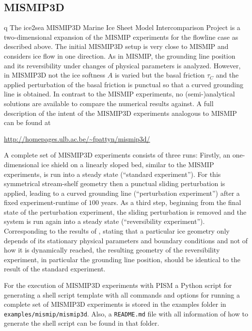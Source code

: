 \subsection{MISMIP3D}\label{subsect:MISMIP3D}
q
 The ice2sea MISMIP3D Marine Ice Sheet Model Intercomparison Project is a two-dimensional expansion of the MISMIP experiments for the flowline case as described above. The initial MISMIP3D setup is very close to MISMIP and considers ice flow in one direction. As in MISMIP, the grounding line position and its reversibility under changes of physical parameters is analyzed. However, in MISMIP3D not the ice softness $A$ is varied but the basal friction $\tau_C$ and the applied perturbation of the basal friction is punctual so that a curved grounding line is obtained. In contrast to the MISMIP experiments, no (semi-)analytical solutions are available to compare the numerical results against. A full description of the intent of the MISMIP3D experiments analogous to MISMIP can be found at

\centerline{\url{http://homepages.ulb.ac.be/~fpattyn/mismip3d/}}

 A complete set of MISMIP3D experiments consists of three runs: Firstly, an one-dimensional ice shield on a linearly sloped bed, similar to the MISMIP experiments, is run into a steady state (``standard experiment''). For this symmetrical stream-shelf geometry then a punctual sliding perturbation is applied, leading to a curved grounding line (``perturbation experiment'') after a fixed experiment-runtime of $100$ years. As a third step, beginning from the final state of the perturbation experiment, the sliding perturbation is removed and the system is run again into a steady state (``reversibility experiment''). Corresponding to the results of \cite{SchoofMarine1}, stating that a particular ice geometry only depends of its stationary physical parameters and boundary conditions and not of how it is dynamically reached, the resulting geometry of the reversibility experiment, in particular the grounding line position, should be identical to the result of the standard experiment.

For the execution of MISMIP3D experiments with PISM a Python script for generating a shell script template with all commands and options for running a complete set of MISMIP3D experiments is stored in the examples folder in \texttt{examples/mismip/mismip3d}. Also, a \texttt{README.md} file with all information of how to generate the shell script can be found in that folder.

